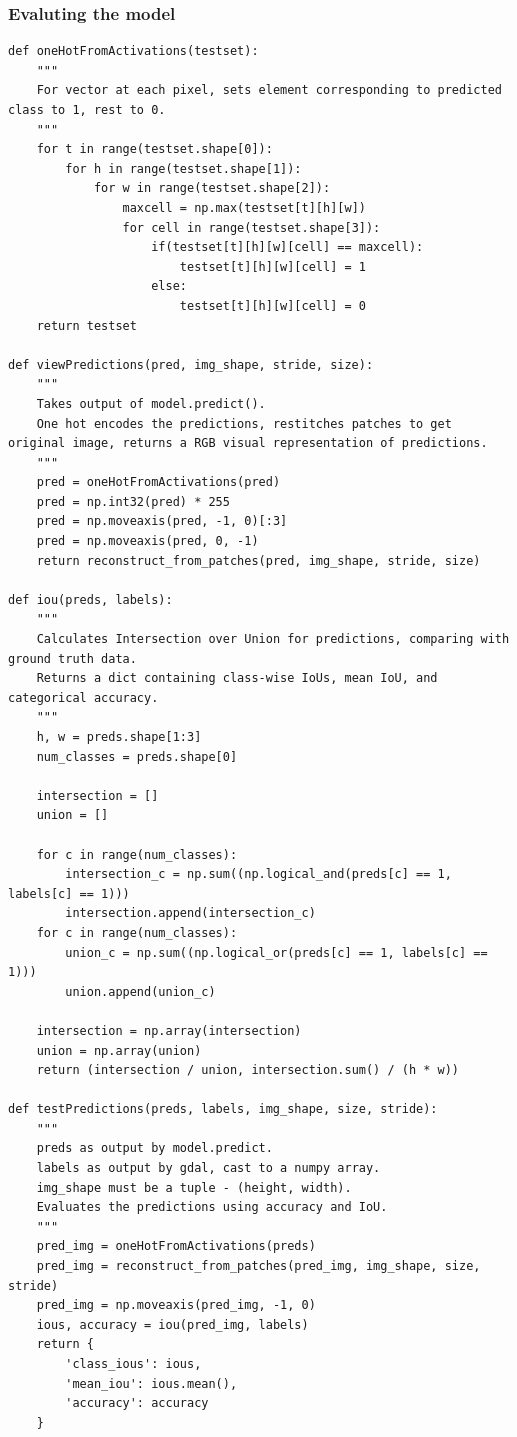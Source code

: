 \documentclass[12pt, a4paper]{report}
\begin{document}
\subsubsection*{Evaluting the model}
\begin{verbatim}
def oneHotFromActivations(testset):
    """
    For vector at each pixel, sets element corresponding to predicted class to 1, rest to 0.
    """
    for t in range(testset.shape[0]):
        for h in range(testset.shape[1]):
            for w in range(testset.shape[2]):
                maxcell = np.max(testset[t][h][w])
                for cell in range(testset.shape[3]):
                    if(testset[t][h][w][cell] == maxcell):
                        testset[t][h][w][cell] = 1
                    else:
                        testset[t][h][w][cell] = 0
    return testset

def viewPredictions(pred, img_shape, stride, size):
    """
    Takes output of model.predict().
    One hot encodes the predictions, restitches patches to get original image, returns a RGB visual representation of predictions.
    """
    pred = oneHotFromActivations(pred)
    pred = np.int32(pred) * 255
    pred = np.moveaxis(pred, -1, 0)[:3]
    pred = np.moveaxis(pred, 0, -1)
    return reconstruct_from_patches(pred, img_shape, stride, size)

def iou(preds, labels):
    """
    Calculates Intersection over Union for predictions, comparing with ground truth data.
    Returns a dict containing class-wise IoUs, mean IoU, and categorical accuracy.
    """
    h, w = preds.shape[1:3]
    num_classes = preds.shape[0]

    intersection = []
    union = []

    for c in range(num_classes):
        intersection_c = np.sum((np.logical_and(preds[c] == 1, labels[c] == 1)))
        intersection.append(intersection_c)
    for c in range(num_classes):
        union_c = np.sum((np.logical_or(preds[c] == 1, labels[c] == 1)))
        union.append(union_c)

    intersection = np.array(intersection)
    union = np.array(union)
    return (intersection / union, intersection.sum() / (h * w))

def testPredictions(preds, labels, img_shape, size, stride):
    """
    preds as output by model.predict.
    labels as output by gdal, cast to a numpy array.
    img_shape must be a tuple - (height, width).
    Evaluates the predictions using accuracy and IoU.
    """
    pred_img = oneHotFromActivations(preds)
    pred_img = reconstruct_from_patches(pred_img, img_shape, size, stride)
    pred_img = np.moveaxis(pred_img, -1, 0)
    ious, accuracy = iou(pred_img, labels)
    return {
        'class_ious': ious,
        'mean_iou': ious.mean(),
        'accuracy': accuracy 
    }


\end{verbatim}
\end{document}
